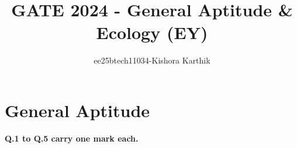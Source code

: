 \documentclass[journal]{IEEEtran}
\begin{document}
\vspace{3cm}


\title{GATE 2024 - General Aptitude \& Ecology (EY)}
\author{ee25btech11034-Kishora Karthik}
\maketitle

{\let\newpage\relax\maketitle}

\renewcommand{\thefigure}{\theenumi}
\renewcommand{\thetable}{\theenumi}
\setlength{\intextsep}{10pt} 

\section*{\textbf{General Aptitude}}
\textbf{Q.1 to Q.5 carry one mark each.}
 
\end{document}
